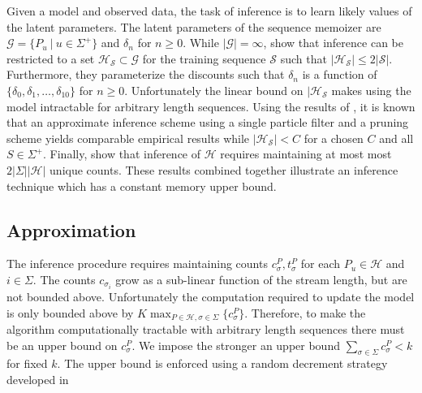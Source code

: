 Given a model and observed data,  the task of inference is to learn likely values of the latent parameters.  The latent parameters of the sequence memoizer are  $\mathcal{G} = \{P_u \ | \ u \in \Sigma^{+} \}$ and $\delta_n$ for $n \geq 0$.  While $| \mathcal{G}| = \infty$, \cite{Wood2009} show that inference can be restricted to a set $\mathcal{H_\mathcal{S}} \subset \mathcal{G}$ for the training sequence $\mathcal{S}$ such that $|\mathcal{H}_\mathcal{S} | \leq 2 |\mathcal{S}|$.  Furthermore, they parameterize the discounts such that $\delta_n$ is a function of $\{\delta_0, \delta_1, \ldots, \delta_{10} \}$ for $n \geq 0$.   Unfortunately the linear bound on $|\mathcal{H}_\mathcal{S}$ makes using the model intractable for arbitrary length sequences.  Using the results of \cite{Bartlett2010}, \cite{Gasthaus2010} it is known that an approximate inference scheme using a single particle filter and a pruning scheme yields comparable empirical results while $| \mathcal{H}_\mathcal{S}| < C$ for a chosen $C$ and all $S \in \Sigma^{+}$.  Finally, \cite{Gasthaus2011} show that inference of $\mathcal{H}$ requires maintaining at most most $2|\Sigma| |\mathcal{H}|$ unique counts.  These results combined together illustrate an inference technique which has a constant memory upper bound.


\subsection{Approximation}

The inference procedure requires maintaining counts $c^P_\sigma,t^P_\sigma$ for each $P_u \in \mathcal{H}$ and $i \in \Sigma$.  The counts $c_{\sigma_i}$ grow as a sub-linear function of the stream length, but are not bounded above.  Unfortunately the computation required to update the model is only bounded above by $K \max_{P \in \mathcal{H}, \sigma \in \Sigma} \{ c^P_\sigma \}$.  Therefore, to make the algorithm computationally tractable with arbitrary length sequences there must be an upper bound on $c^P_\sigma$.  We impose the stronger an upper bound $\sum_{\sigma \in \Sigma} c_\sigma^P < k$ for fixed $k$.  The upper bound is enforced using a random decrement strategy developed in 




